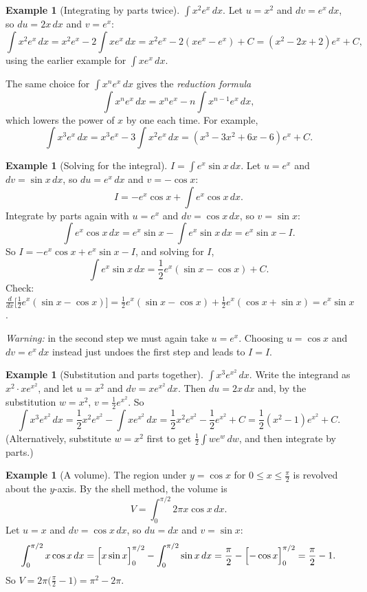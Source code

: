 \documentclass[12pt,letterpaper]{article}
\theoremstyle{definition}
\newtheorem{example}[theorem]{Example}
\begin{document}
\begin{example}[Integrating by parts twice]
  $\displaystyle\int x^2e^x\,dx$. Let $u=x^2$ and $dv=e^x\,dx$, so
  $du=2x\,dx$ and $v=e^x$:
  \[
    \int x^2e^x\,dx=x^2e^x-2\int xe^x\,dx=x^2e^x-2(xe^x-e^x)+C
      =(x^2-2x+2)e^x+C,
  \]
  using the earlier example for $\int xe^x\,dx$.

  The same choice for $\int x^ne^x\,dx$ gives the \emph{reduction formula}
  \[
    \int x^ne^x\,dx=x^ne^x-n\int x^{n-1}e^x\,dx,
  \]
  which lowers the power of $x$ by one each time. For example,
  \[
    \int x^3e^x\,dx=x^3e^x-3\int x^2e^x\,dx=(x^3-3x^2+6x-6)e^x+C.
  \]
\end{example}

\begin{example}[Solving for the integral]
  $\displaystyle I=\int e^x\sin x\,dx$. Let $u=e^x$ and $dv=\sin x\,dx$, so
  $du=e^x\,dx$ and $v=-\cos x$:
  \[
    I=-e^x\cos x+\int e^x\cos x\,dx.
  \]
  Integrate by parts again with $u=e^x$ and $dv=\cos x\,dx$, so $v=\sin x$:
  \[
    \int e^x\cos x\,dx=e^x\sin x-\int e^x\sin x\,dx=e^x\sin x-I.
  \]
  So $I=-e^x\cos x+e^x\sin x-I$, and solving for $I$,
  \[
    \int e^x\sin x\,dx=\frac12e^x(\sin x-\cos x)+C.
  \]
  Check: $\frac{d}{dx}\bigl[\frac12e^x(\sin x-\cos x)\bigr]
  =\frac12e^x(\sin x-\cos x)+\frac12e^x(\cos x+\sin x)=e^x\sin x$.

  \emph{Warning:} in the second step we must again take $u=e^x$. Choosing
  $u=\cos x$ and $dv=e^x\,dx$ instead just undoes the first step and leads to
  $I=I$.
\end{example}

\begin{example}[Substitution and parts together]
  $\displaystyle\int x^3e^{x^2}\,dx$. Write the integrand as
  $x^2\cdot xe^{x^2}$, and let $u=x^2$ and $dv=xe^{x^2}\,dx$. Then
  $du=2x\,dx$ and, by the substitution $w=x^2$, $v=\frac12e^{x^2}$. So
  \[
    \int x^3e^{x^2}\,dx=\frac12x^2e^{x^2}-\int xe^{x^2}\,dx
      =\frac12x^2e^{x^2}-\frac12e^{x^2}+C
      =\frac12(x^2-1)e^{x^2}+C.
  \]
  (Alternatively, substitute $w=x^2$ first to get
  $\frac12\int we^w\,dw$, and then integrate by parts.)
\end{example}

\begin{example}[A volume]
  The region under $y=\cos x$ for $0\leq x\leq\frac\pi2$ is revolved about
  the $y$-axis. By the shell method, the volume is
  \[
    V=\int_0^{\pi/2}2\pi x\cos x\,dx.
  \]
  Let $u=x$ and $dv=\cos x\,dx$, so $du=dx$ and $v=\sin x$:
  \[
    \int_0^{\pi/2}x\cos x\,dx=\Bigl[x\sin x\Bigr]_0^{\pi/2}
      -\int_0^{\pi/2}\sin x\,dx
      =\frac\pi2-\Bigl[-\cos x\Bigr]_0^{\pi/2}=\frac\pi2-1.
  \]
  So $V=2\pi\bigl(\frac\pi2-1\bigr)=\pi^2-2\pi$.
\end{example}
\end{document}
